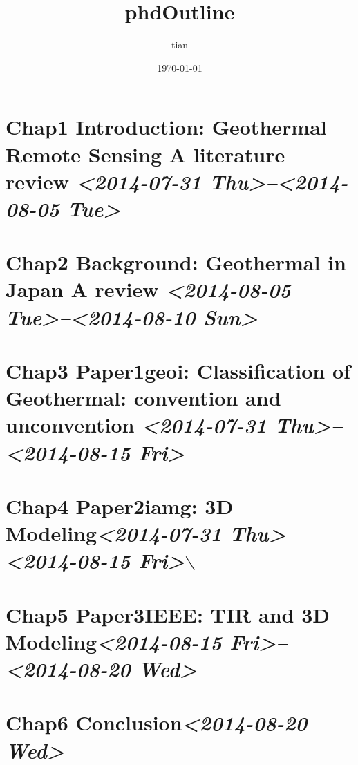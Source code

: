 \documentclass[11pt]{article}
\author{tian}
\date{\today}
\title{phdOutline}
\begin{document}
\maketitle
\tableofcontents

\section{Chap1 Introduction: Geothermal Remote Sensing A literature review  \textit{<2014-07-31 Thu>--<2014-08-05 Tue>}}
\label{sec-1}

\section{Chap2 Background: Geothermal in Japan A review \textit{<2014-08-05 Tue>--<2014-08-10 Sun>}}
\label{sec-2}
\section{Chap3 Paper1geoi: Classification of Geothermal: convention and unconvention \textit{<2014-07-31 Thu>--<2014-08-15 Fri>}}
\label{sec-3}
\section{Chap4 Paper2iamg: 3D Modeling\textit{<2014-07-31 Thu>--<2014-08-15 Fri>}$\backslash$}
\label{sec-4}
\section{Chap5 Paper3IEEE: TIR and 3D Modeling\textit{<2014-08-15 Fri>--<2014-08-20 Wed>}}
\label{sec-5}
\section{Chap6 Conclusion\textit{<2014-08-20 Wed>}}
\label{sec-6}
\end{document}
